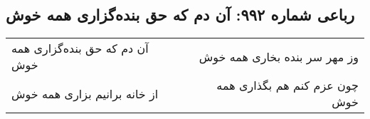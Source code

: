 \begin{center}
\section*{رباعی شماره ۹۹۲: آن دم که حق بنده‌گزاری همه خوش}
\label{sec:0992}
\begin{longtable}{l p{0.5cm} r}
آن دم که حق بنده‌گزاری همه خوش
&&
وز مهر سر بنده بخاری همه خوش
\\
از خانه برانیم بزاری همه خوش
&&
چون عزم کنم هم بگذاری همه خوش
\\
\end{longtable}
\end{center}
